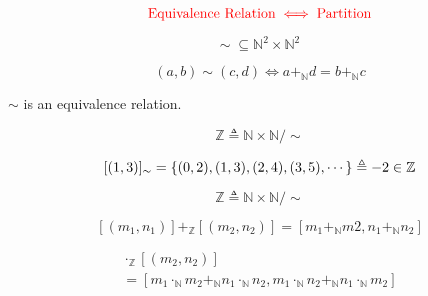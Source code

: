 \begin{frame}{}

  \[
    \textcolor{red}{\text{Equivalence Relation} \iff \text{Partition}}
  \]
\end{frame}

\begin{frame}{}
  \begin{definition}
    \[
      \sim\; \subseteq \mathbb{N}^2 \times \mathbb{N}^2
    \]

    \[
      (a, b) \sim (c, d) \iff a +_{\mathbb{N}} d = b +_{\mathbb{N}} c
    \]
  \end{definition}

  \pause
  \vspace{0.30cm}
  \begin{theorem}
    $\sim$ is an equivalence relation.
  \end{theorem}

  \pause
  \vspace{0.30cm}
  \begin{center}
  \end{center}

  \pause
  \begin{definition}[$\mathbb{Z}$]
    \[
      \mathbb{Z} \triangleq \mathbb{N} \times \mathbb{N}/\sim
    \]
  \end{definition}

  \pause
  \[
    [(1, 3)]_{\sim} = \{(0, 2), (1, 3), (2, 4), (3, 5), \cdots\} \triangleq -2 \in \mathbb{Z}
  \]
\end{frame}

\begin{frame}{}
  \[
    \mathbb{Z} \triangleq \mathbb{N} \times \mathbb{N}/\sim
  \]
\end{frame}

\begin{frame}{}
  \begin{definition}[$+_\mathbb{Z}$]
    \[
      [(m_1, n_1)] +_{\mathbb{Z}} [(m_2, n_2)] = [m_1 +_{\mathbb{N}} m2, n_1 +_{\mathbb{N}} n_2]
    \]
  \end{definition}

  \pause
  \vspace{0.60cm}
  \begin{definition}
    \begin{gather*}
      [(m_1, n_1)] \cdot_{\mathbb{Z}} [(m_2, n_2)] \\
      = [m_1 \cdot_{\mathbb{N}} m_2 +_{\mathbb{N}} n_1 \cdot_{\mathbb{N}} n_2, 
         m_1 \cdot_{\mathbb{N}} n_2 +_{\mathbb{N}} n_1 \cdot_{\mathbb{N}} m_2]
    \end{gather*}
  \end{definition}
\end{frame}

